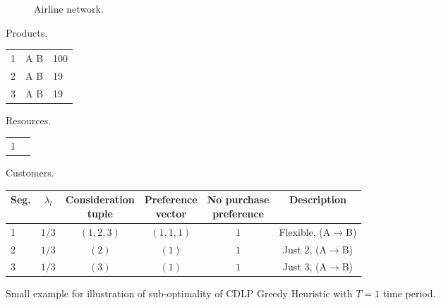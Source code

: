 \begin{figure}[H]
	\begin{subfigure}[t]{.3\linewidth}
		\centering
		\caption{Airline network.}
	\end{subfigure}%
	\quad
	\begin{subtable}[t]{.4\linewidth}
		\caption{Products. }
		\small
		\centering
		\begin{tabular}{yxz}
			\toprule
			 &  & \\
			 & A \rightarrow B & 100\\
			2 & A \rightarrow B & 19\\
			3 & A \rightarrow B & 19\\
			\bottomrule
		\end{tabular}
	\end{subtable}%
	\quad
	\begin{subtable}[t]{.2\linewidth}
		\caption{Resources. \label{tb:ColGen:Res}}
		\small
		\centering
		\begin{tabular}{yy}
			\toprule
			 & \\
			 & \infty\\
			\bottomrule
		\end{tabular}
	\end{subtable}
	
	\begin{subtable}{\linewidth}
		\caption{Customers.\label{tb:ColGen:Cust}}
		\small
		\centering
		\begin{tabular}{lccccc}
			\toprule
			Seg. & $\lambda_l$ & \specialcell[b]{Consideration\\tuple} & \specialcell[b]{Preference \\vector} & \specialcell[b]{No purchase \\preference} & Description\\
			\midrule
			1 & $1/3$ & $(1, 2, 3)$ & $(1, 1, 1)$ & $1$ & Flexible, (A$\rightarrow$B)\\
			2 & $1/3$ & $(2)$ & $(1)$ & $1$ & Just $2$, (A$\rightarrow$B)\\
			3 & $1/3$ & $(3)$ & $(1)$ & $1$ & Just $3$, (A$\rightarrow$B)\\
			\bottomrule
		\end{tabular}
	\end{subtable}
	\caption[Small example for illustration of sub-optimality CDLP Greedy Heuristic.]{Small example for illustration of sub-optimality of CDLP Greedy Heuristic with $T=1$ time period.\label{fig-ColGen}}
\end{figure}

